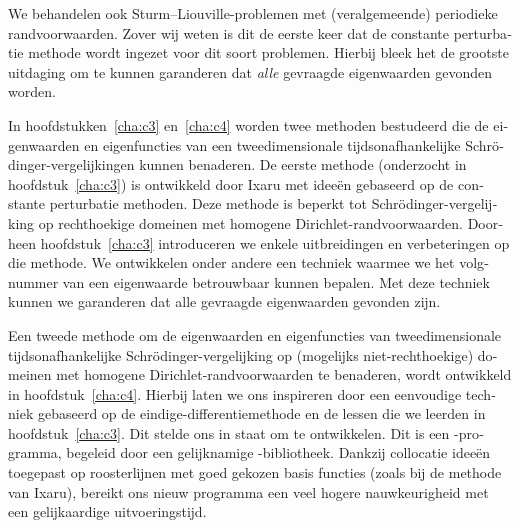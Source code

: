 \begin{otherlanguage}{dutch}
We behandelen ook Sturm--Liouville-problemen met (veralgemeende) periodieke randvoorwaarden. Zover wij weten is dit de eerste keer dat de constante perturbatie methode wordt ingezet voor dit soort problemen. Hierbij bleek het de grootste uitdaging om te kunnen garanderen dat \emph{alle} gevraagde eigenwaarden gevonden worden.

In hoofdstukken~\ref{cha:c3} en~\ref{cha:c4} worden twee methoden bestudeerd die de eigenwaarden en eigenfuncties van een tweedimensionale tijdsonafhankelijke Schrödinger-vergelijkingen kunnen benaderen. De eerste methode (onderzocht in hoofdstuk~\ref{cha:c3}) is ontwikkeld door Ixaru met ideeën gebaseerd op de constante perturbatie methoden. Deze methode is beperkt tot Schrödinger-vergelijking op rechthoekige domeinen met homogene Dirichlet-randvoorwaarden. Doorheen hoofdstuk~\ref{cha:c3} introduceren we enkele uitbreidingen en verbeteringen op die methode. We ontwikkelen onder andere een techniek waarmee we het volgnummer van een eigenwaarde betrouwbaar kunnen bepalen. Met deze techniek kunnen we garanderen dat alle gevraagde eigenwaarden gevonden zijn.

Een tweede methode om de eigenwaarden en eigenfuncties van tweedimensionale tijdsonafhankelijke Schrödinger-vergelijking op (mogelijks niet-rechthoekige) domeinen met homogene Dirichlet-randvoorwaarden te benaderen, wordt ontwikkeld in hoofdstuk~\ref{cha:c4}. Hierbij laten we ons inspireren door een eenvoudige techniek gebaseerd op de eindige-differentiemethode en de lessen die we leerden in hoofdstuk~\ref{cha:c3}. Dit stelde ons in staat om \strands{} te ontwikkelen. Dit is een \cpp{}-programma, begeleid door een gelijknamige \lpython{}-bibliotheek. Dankzij collocatie ideeën toegepast op roosterlijnen met goed gekozen basis functies (zoals bij de methode van Ixaru), bereikt ons nieuw programma een veel hogere nauwkeurigheid met een gelijkaardige uitvoeringstijd. 

\end{otherlanguage}

\stopchapter
